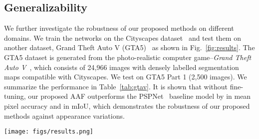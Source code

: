\subsection{Generalizability}
We further investigate the robustness of our proposed methods on different domains. We train the networks on the Cityscapes dataset~\cite{Cordts2016Cityscapes} and test them on another dataset, Grand Theft Auto V (GTA5)~\cite{Richter_2016_ECCV} as shown in Fig.~\ref{fig:results}. The GTA5 dataset is generated from the photo-realistic computer game--\textit{Grand Theft Auto V}~\cite{Richter_2016_ECCV}, which consists of 24,966 images with densely labelled segmentation maps compatible with Cityscapes. We test on GTA5 Part 1 (2,500 images). We summarize the performance in Table~\ref{tab:gtav}. It is shown that without fine-tuning, our proposed AAF outperforms the PSPNet~\cite{zhao2016pyramid} baseline model by  in mean pixel accuracy and  in mIoU, which demonstrates the robustness of our proposed methods against appearance variations. 



\begin{table*}[t]
  \centering
    \vspace{0.5pt}
    \caption{Per-class results on GTA5 Part 1.}
    \label{tab:gtav}
\end{table*}

\begin{figure*}[b]
    \centering
    \texttt{[image: figs/results.png]}
    \caption{Visual quality comparisons on the VOC 2012~\cite{everingham2010pascal} validation set (the first four rows), Cityscapes~\cite{Cordts2016Cityscapes} validation set (the middle two rows) and GTA5~\cite{Richter_2016_ECCV} part 1 (the bottom row): (a) image, (b) ground truth, (c) PSPNet~\cite{zhao2016pyramid}, (d) affinity fields, and (e) adaptive affinity fields (AAF).}
    \label{fig:results}
\end{figure*}